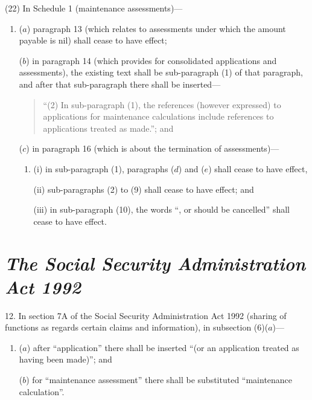 \documentclass[12pt,a4paper]{article}
\begin{document}
(22) In Schedule 1 (maintenance assessments)—
\begin{enumerate}\item[]
($a$) paragraph 13 (which relates to assessments under which the amount payable is nil) shall cease to have effect;

($b$) in paragraph 14 (which provides for consolidated applications and assessments), the existing text shall be sub-paragraph (1)  of that paragraph, and after that sub-paragraph there shall be inserted—
\begin{quotation}
“(2) In sub-paragraph (1), the references (however expressed) to applications for maintenance calculations include references to applications treated as made.”; and
\end{quotation}

($c$) in paragraph 16 (which is about the termination of assessments)—
\begin{enumerate}\item[]
(i) in sub-paragraph (1), paragraphs ($d$)  and ($e$)  shall cease to have effect,

(ii) sub-paragraphs (2)  to (9)  shall cease to have effect; and

(iii) in sub-paragraph (10), the words “, or should be cancelled” shall cease to have effect.
\end{enumerate}
\end{enumerate}


\section*{\itshape The Social Security Administration Act 1992}

12. In section 7A of the Social Security Administration Act 1992 (sharing of functions as regards certain claims and information), in subsection (6)($a$)—
\begin{enumerate}\item[]
($a$) after “application” there shall be inserted “(or an application treated as having been made)”; and

($b$) for “maintenance assessment” there shall be substituted “maintenance calculation”.
\end{enumerate}

\end{document}
